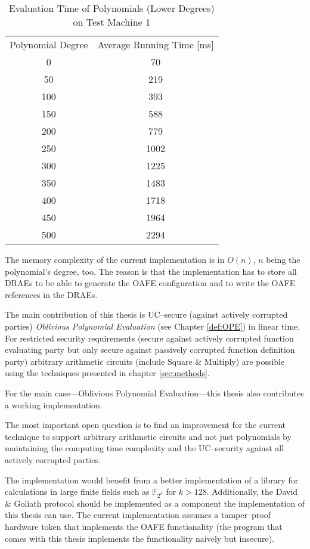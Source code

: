 \begin{table}[ht]
  \centering
  \begin{tabular}{|c|c|}
    Polynomial Degree & Average Running Time [ms] \\
      0 &   70 \\
     50 &  219 \\
    100 &  393 \\
    150 &  588 \\
    200 &  779 \\
    250 & 1002 \\
    300 & 1225 \\
    350 & 1483 \\
    400 & 1718 \\
    450 & 1964 \\
    500 & 2294 \\
  \end{tabular}
  \caption{Evaluation Time of Polynomials (Lower Degrees) on Test Machine 1}
  \label{tab:poly-deg-t-small}
\end{table}


%
%
\label{sec:mem-complexity}

The memory complexity of the current implementation is in $O(n)$, $n$ being the
polynomial's degree, too. The reason is that the implementation has to store all
DRAEs to be able to generate the OAFE configuration and to write the OAFE
references in the DRAEs.


%
%
\label{sec:contribution}

The main contribution of this thesis is UC--secure (against actively corrupted
parties) \emph{Oblivious Polynomial Evaluation} (see Chapter \ref{def:OPE}) in
linear time. For restricted security requirements (secure against actively
corrupted function evaluating party but only secure against passively corrupted
function definition party) arbitrary arithmetic circuits (include Square \&
Multiply) are possible using the techniques presented in chapter
\ref{sec:methods}.

For the main case---Oblivious Polynomial Evaluation---this thesis also
contributes a working implementation.


%
%
\label{sec:outlook}

The most important open question is to find an improvement for the current
technique to support arbitrary arithmetic circuits and not just polynomials by
maintaining the computing time complexity and the UC--security against all
actively corrupted parties.

The implementation would benefit from a better implementation of a library for
calculations in large finite fields such as $\mathbb{F}_{2^{k}}$ for $k > 128$.
Additionally, the David \& Goliath protocol \cite{davidgoliath} should be
implemented as a component the implementation of this thesis can use. The
current implementation assumes a tamper--proof hardware token that implements
the OAFE functionality (the program \JWBtoken{} that comes with this thesis
implements the functionality naively but insecure).

